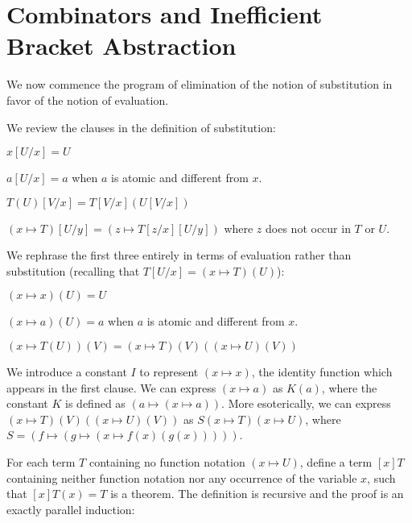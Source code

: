 \documentclass{article}
\begin{document}
\section{Combinators and Inefficient Bracket Abstraction}

We now commence the program of elimination of the notion of
substitution in favor of the notion of evaluation.

We review the clauses in the definition of substitution:

\begin{description}

\item $x[U/x] = U$

\item $a[U/x] = a$ when $a$ is atomic and different from $x$.

\item $T(U)[V/x] = T[V/x](U[V/x])$

\item $(x \mapsto T)[U/y] = (z \mapsto T[z/x][U/y])$ where $z$ does
not occur in $T$ or $U$.

\end{description}

We rephrase the first three entirely in terms of evaluation rather than
substitution (recalling that $T[U/x] = (x \mapsto T)(U)$):

\begin{description}

\item $(x \mapsto x)(U) = U$

\item $(x \mapsto a)(U) = a$ when $a$ is atomic and different from $x$.

\item $(x \mapsto T(U))(V) = (x \mapsto T)(V)((x \mapsto U)(V))$

\end{description}

We introduce a constant $I$ to represent $(x \mapsto x)$, the identity
function which appears in the first clause.  We can express $(x
\mapsto a)$ as $K(a)$, where the constant $K$ is defined as $(a
\mapsto (x \mapsto a))$.  More esoterically, we can express $(x
\mapsto T)(V)((x \mapsto U)(V))$ as $S(x\mapsto T)(x \mapsto U)$,
where $S = (f \mapsto (g \mapsto (x \mapsto f(x)(g(x)))))$.

For each term $T$ containing no function notation $(x \mapsto U)$,
define a term $[x]T$ containing neither function notation nor any occurrence
of the variable $x$, such that $[x]T(x) = T$ is a theorem.  The definition
is recursive and the proof is an exactly parallel induction:
\end{document}
